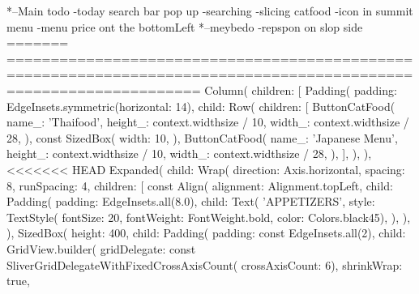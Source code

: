 *--Main todo 
-today  search bar pop up 
-searching
-slicing catfood 
-icon in summit menu
-menu price ont the bottomLeft
*--meybedo
-repspon on slop side
=======
==================================================================================================================
                Column(
                    children: [
                      Padding(
                        padding: EdgeInsets.symmetric(horizontal: 14),
                        child: Row(
                          children: [
                            ButtonCatFood(
                              name_: 'Thaifood',
                              height_: context.widthsize / 10,
                              width_: context.widthsize / 28,
                            ),
                            const SizedBox(
                              width: 10,
                            ),
                            ButtonCatFood(
                              name_: 'Japanese Menu',
                              height_: context.widthsize / 10,
                              width_: context.widthsize / 28,
                            ),
                          ],
                        ),
                      ),
<<<<<<< HEAD
                      Expanded(
                        child: Wrap(
                          direction: Axis.horizontal,
                          spacing: 8,
                          runSpacing: 4,
                          children: [
                            const Align(
                              alignment: Alignment.topLeft,
                              child: Padding(
                                padding: EdgeInsets.all(8.0),
                                child: Text(
                                  'APPETIZERS',
                                  style: TextStyle(
                                      fontSize: 20,
                                      fontWeight: FontWeight.bold,
                                      color: Colors.black45),
                                ),
                              ),
                            ),
                            SizedBox(
                              height: 400,
                              child: Padding(
                                padding: const EdgeInsets.all(2),
                                child: GridView.builder(
                                    gridDelegate:
                                        const SliverGridDelegateWithFixedCrossAxisCount(
                                            crossAxisCount: 6),
                                    shrinkWrap: true,
